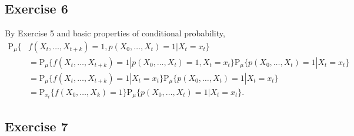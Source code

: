 \documentclass[12pt]{article}
\newcommand{\Prob}{\mathrm{P}}
\begin{document}
\subsection*{Exercise 6}

By Exercise 5 and basic properties of conditional probability,
\begin{align*}
\Prob_\mu \{&f(X_t, \ldots, X_{t+k}) = 1, p(X_0, \ldots, X_t) = 1 | X_t = x_t\} \\
&= \Prob_\mu \{f(X_t, \ldots, X_{t+k}) = 1 | p(X_0, \ldots, X_t) = 1, X_t = x_t\} \Prob_\mu \{p(X_0, \ldots, X_t) = 1 | X_t = x_t\} \\
&= \Prob_\mu \{f(X_t, \ldots, X_{t+k}) = 1 | X_t = x_t\} \Prob_\mu \{p(X_0, \ldots, X_t) = 1 | X_t = x_t\} \\
&= \Prob_{x_t} \{f(X_0, \ldots, X_k) = 1\} \Prob_\mu \{p(X_0, \ldots, X_t) = 1 | X_t = x_t\}.
\end{align*}

\subsection*{Exercise 7}
\end{document}
